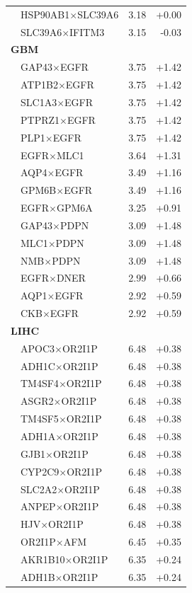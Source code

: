 \begin{longtable}{llrr}
 & HSP90AB1$\times$SLC39A6 & 3.18 & +0.00\\
 & SLC39A6$\times$IFITM3 & 3.15 & -0.03\\
\multicolumn{4}{l}{\textbf{GBM}}\\\hline
 & GAP43$\times$EGFR & 3.75 & +1.42\\
 & ATP1B2$\times$EGFR & 3.75 & +1.42\\
 & SLC1A3$\times$EGFR & 3.75 & +1.42\\
 & PTPRZ1$\times$EGFR & 3.75 & +1.42\\
 & PLP1$\times$EGFR & 3.75 & +1.42\\
 & EGFR$\times$MLC1 & 3.64 & +1.31\\
 & AQP4$\times$EGFR & 3.49 & +1.16\\
 & GPM6B$\times$EGFR & 3.49 & +1.16\\
 & EGFR$\times$GPM6A & 3.25 & +0.91\\
 & GAP43$\times$PDPN & 3.09 & +1.48\\
 & MLC1$\times$PDPN & 3.09 & +1.48\\
 & NMB$\times$PDPN & 3.09 & +1.48\\
 & EGFR$\times$DNER & 2.99 & +0.66\\
 & AQP1$\times$EGFR & 2.92 & +0.59\\
 & CKB$\times$EGFR & 2.92 & +0.59\\
\multicolumn{4}{l}{\textbf{LIHC}}\\\hline
 & APOC3$\times$OR2I1P & 6.48 & +0.38\\
 & ADH1C$\times$OR2I1P & 6.48 & +0.38\\
 & TM4SF4$\times$OR2I1P & 6.48 & +0.38\\
 & ASGR2$\times$OR2I1P & 6.48 & +0.38\\
 & TM4SF5$\times$OR2I1P & 6.48 & +0.38\\
 & ADH1A$\times$OR2I1P & 6.48 & +0.38\\
 & GJB1$\times$OR2I1P & 6.48 & +0.38\\
 & CYP2C9$\times$OR2I1P & 6.48 & +0.38\\
 & SLC2A2$\times$OR2I1P & 6.48 & +0.38\\
 & ANPEP$\times$OR2I1P & 6.48 & +0.38\\
 & HJV$\times$OR2I1P & 6.48 & +0.38\\
 & OR2I1P$\times$AFM & 6.45 & +0.35\\
 & AKR1B10$\times$OR2I1P & 6.35 & +0.24\\
 & ADH1B$\times$OR2I1P & 6.35 & +0.24\\

\end{longtable}
